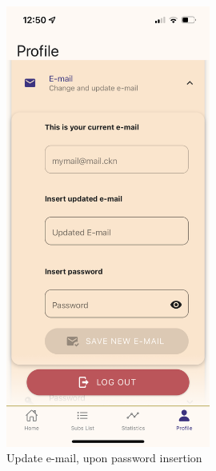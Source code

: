 \documentclass[12pt]{article}
\begin{document}
\begin{figure}[h!]
\begin{minipage}[c]{0.45\textwidth}
        \includegraphics[width=0.6\textwidth, clip]{../../assets/smartphone/profileNewMail.PNG}
        \caption{Update e-mail, upon password insertion}
        \label{fig:profileNewMail}
    \end{minipage}
\end{figure}
\end{document}

